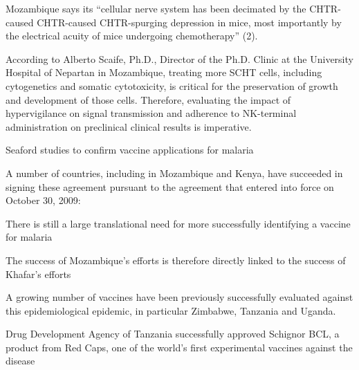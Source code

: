\documentclass{article}
\begin{document}
Mozambique says its “cellular nerve system has been decimated by the CHTR-caused CHTR-caused CHTR-spurging depression in mice, most importantly by the electrical acuity of mice undergoing chemotherapy” (2).

According to Alberto Scaife, Ph.D., Director of the Ph.D. Clinic at the University Hospital of Nepartan in Mozambique, treating more SCHT cells, including cytogenetics and somatic cytotoxicity, is critical for the preservation of growth and development of those cells. Therefore, evaluating the impact of hypervigilance on signal transmission and adherence to NK-terminal administration on preclinical clinical results is imperative.

Seaford studies to confirm vaccine applications for malaria

A number of countries, including in Mozambique and Kenya, have succeeded in signing these agreement pursuant to the agreement that entered into force on October 30, 2009:

There is still a large translational need for more successfully identifying a vaccine for malaria

The success of Mozambique’s efforts is therefore directly linked to the success of Khafar’s efforts

A growing number of vaccines have been previously successfully evaluated against this epidemiological epidemic, in particular Zimbabwe, Tanzania and Uganda.

Drug Development Agency of Tanzania successfully approved Schignor BCL, a product from Red Caps, one of the world’s first experimental vaccines against the disease
\end{document}
